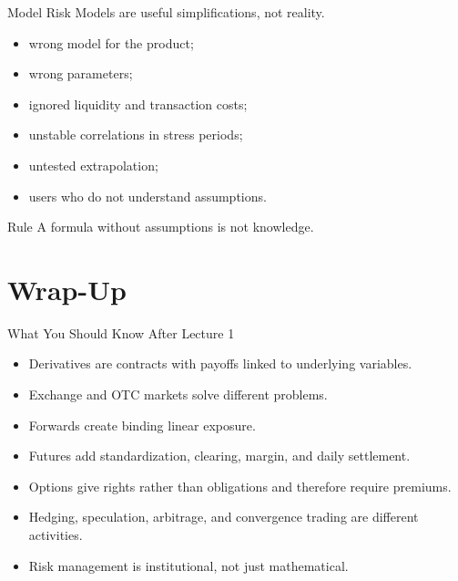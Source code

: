 \documentclass[aspectratio=169,11pt]{beamer}
\begin{document}
\begin{frame}{Model Risk}
    Models are useful simplifications, not reality.

    \begin{itemize}
        \item wrong model for the product;
        \item wrong parameters;
        \item ignored liquidity and transaction costs;
        \item unstable correlations in stress periods;
        \item untested extrapolation;
        \item users who do not understand assumptions.
    \end{itemize}

    \begin{block}{Rule}
        A formula without assumptions is not knowledge.
    \end{block}
\end{frame}

\section{Wrap-Up}

\begin{frame}{What You Should Know After Lecture 1}
    \begin{itemize}
        \item Derivatives are contracts with payoffs linked to underlying variables.
        \item Exchange and OTC markets solve different problems.
        \item Forwards create binding linear exposure.
        \item Futures add standardization, clearing, margin, and daily settlement.
        \item Options give rights rather than obligations and therefore require premiums.
        \item Hedging, speculation, arbitrage, and convergence trading are different activities.
        \item Risk management is institutional, not just mathematical.
    \end{itemize}
\end{frame}
\end{document}
